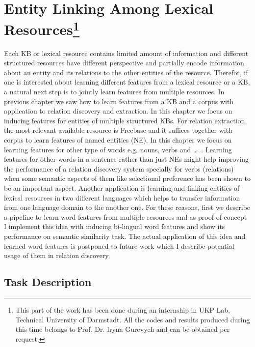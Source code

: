 \chapter[Entity Linking Among Lexical Resources]{Entity Linking Among Lexical
Resources\footnote{This part of the work has been done during an internship in UKP Lab, Technical University of Darmstadt. All the codes and results produced during
this time belongs to Prof. Dr. Iryna Gurevych and can be obtained per
request.}}

\label{ch:ent-link}


Each KB or lexical resource contains limited amount of information and
different structured resources have different perspective and partially encode
information about an entity and its relations to the other entities of the
resource. Therefor, if one is interested about learning different features from
a lexical resource or a KB, a natural next step is to jointly learn features
from multiple resources. In previous chapter we saw how to learn features from
a KB and a corpus with application to relation discovery and extraction. In this
chapter we focus on inducing features for entities of multiple structured KBs.
For relation extraction, the most relevant available resource is Freebase and
it suffices together with corpus to learn features of named entities (NE). In
this chapter we focus on learning features for other type of words e.g. nouns,
verbs and \ldots~. Learning features for other words in a sentence rather than
just NEs might help improving the performance of a relation discovery system
specially for verbs (relations) when some semantic aspects of them like
selectional preference has been shown to be an important aspect. Another
application is learning and linking entities of lexical resources in two
different languages which helps to transfer information from one language domain
to the another one. For these reasons, first we describe a pipeline to learn
word features from multiple resources and as proof of concept I implement this
idea with inducing bi-lingual word features and show its performance
on semantic similarity task. The actual application of this idea and learned
word features is postponed to future work which I describe potential usage of
them in relation discovery.


\section{Task Description}
\label{sec:xkb-task-desc}

